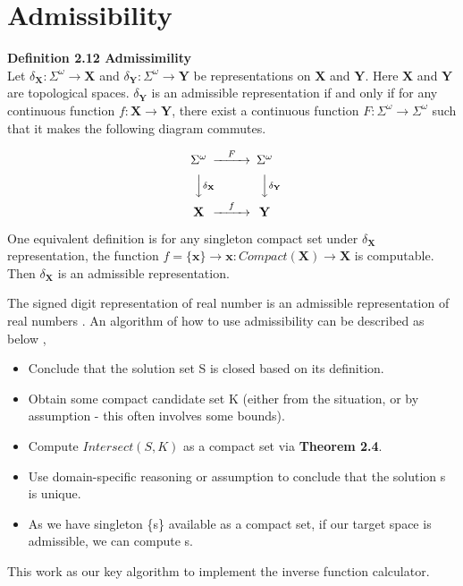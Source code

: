 \documentclass[12pt,twoside,notitlepage]{report}
\begin{document}
\section {Admissibility}
\textbf{Definition 2.12 Admissimility} \\
Let $\delta_\mathbf{X} : \Sigma^\omega \to \mathbf{X}$ and $\delta_\mathbf{Y} : \Sigma^\omega \to \mathbf{Y}$ be representations on $\mathbf{X}$ and $\mathbf{Y}$. Here $\mathbf{X}$ and $\mathbf{Y}$ are topological spaces. $\delta_\mathbf{Y}$ is an admissible representation if and only if for any continuous function $f: \mathbf{X} \to \mathbf{Y}$, there exist a continuous function $F : \Sigma^\omega \to \Sigma^\omega$ such that  it makes the following diagram commutes.

$$\begin{CD}
\Sigma^\omega @>F>> \Sigma^\omega\\
@VV\delta_\mathbf{X}V @VV\delta_\mathbf{Y}V\\
\mathbf{X} @>f>> \mathbf{Y}
\end{CD}$$

One equivalent definition is for any singleton compact set under $\delta_\mathbf{X}$ representation, the function $f = \{\mathbf{x}\} \to \mathbf{x} : Compact(\mathbf{X}) \to \mathbf{X}$ is computable. Then $\delta_\mathbf{X}$ is an admissible representation. 
 

The signed digit representation of real number is an admissible representation of real numbers \cite{weihrauchd}. An algorithm of how to use admissibility can be described as below \cite{pauly-synthetic-arxiv},


\begin{itemize}
\item Conclude that the solution set S is closed based on its definition.
\item Obtain some compact candidate set K (either from the situation, or by assumption - this often involves some bounds).
\item Compute $Intersect(S,K)$ as a compact set via \textbf{Theorem 2.4}.
\item Use domain-specific reasoning or assumption to conclude that the solution s is unique.
\item As we have singleton \{s\} available as a compact set, if our target space is admissible, we can compute s.
\end{itemize}

This work as our key algorithm to implement the inverse function calculator.
\end{document}
